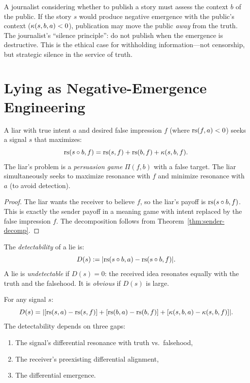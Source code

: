 \begin{example}
A journalist considering whether to publish a story must assess the context
$b$ of the public. If the story $s$ would produce negative emergence with the
public's context ($\kappa(s, b, a) < 0$), publication may move the public
\emph{away} from the truth. The journalist's ``silence principle'': do not
publish when the emergence is destructive. This is the ethical case for
withholding information---not censorship, but strategic silence in the service
of truth.
\end{example}


\section{Lying as Negative-Emergence Engineering}

\begin{theorem}
\label{thm:liar-optimization}
A liar with true intent $a$ and desired false impression $f$ (where
$\mathrm{rs}(f, a) < 0$) seeks a signal $s$ that maximizes:
\[
\mathrm{rs}(s \circ b, f) = \mathrm{rs}(s, f) + \mathrm{rs}(b, f) + \kappa(s, b, f).
\]
The liar's problem is a \emph{persuasion game} $\Pi(f, b)$ with a false
target. The liar simultaneously seeks to maximize resonance with $f$
and minimize resonance with $a$ (to avoid detection).
\end{theorem}

\begin{proof}
The liar wants the receiver to believe $f$, so the liar's payoff is
$\mathrm{rs}(s \circ b, f)$. This is exactly the sender payoff in a meaning game
with intent replaced by the false impression $f$. The decomposition follows
from Theorem~\ref{thm:sender-decomp}.
\end{proof}

\begin{definition}
\label{def:detection}
The \emph{detectability} of a lie is:
\[
D(s) := |\mathrm{rs}(s \circ b, a) - \mathrm{rs}(s \circ b, f)|.
\]
A lie is \emph{undetectable} if $D(s) = 0$: the received idea resonates
equally with the truth and the falsehood. It is \emph{obvious} if $D(s)$
is large.
\end{definition}

\begin{theorem}
\label{thm:lying-tradeoff}
For any signal $s$:
\[
D(s) = |[\mathrm{rs}(s, a) - \mathrm{rs}(s, f)] + [\mathrm{rs}(b, a) - \mathrm{rs}(b, f)]
+ [\kappa(s, b, a) - \kappa(s, b, f)]|.
\]
The detectability depends on three gaps:
\begin{enumerate}
\item The signal's differential resonance with truth vs.\ falsehood,
\item The receiver's preexisting differential alignment,
\item The differential emergence.
\end{enumerate}
\end{theorem}

